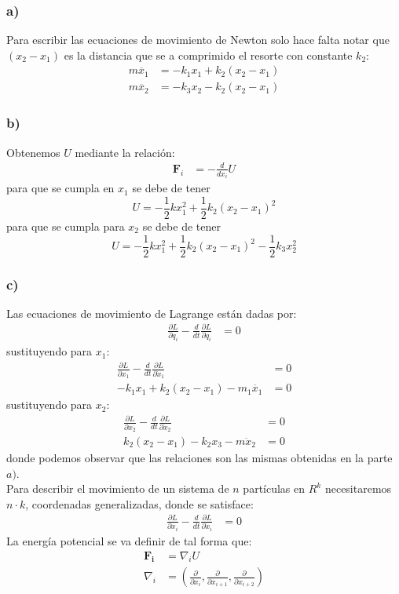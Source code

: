 \documentclass{article}
\begin{document}
\begin{tcolorbox}[breakable]
    \subsubsection*{a)}
    Para escribir las ecuaciones de movimiento de Newton solo hace falta notar que 
    $(x_2-x_1)$ es la distancia que se a comprimido el resorte con constante $k_2$:
    \begin{align*}
        m\ddot{x_1} &= -k_1x_1 + k_2(x_2-x_1) \\
        m\ddot{x_2} &= -k_3x_2 - k_2(x_2-x_1)
    \end{align*}
    \subsubsection*{b)}
    Obtenemos $U$ mediante la relación:
    \begin{align*}
        \bm{F}_i &= -\frac{d}{dx_i}U
    \end{align*}
    para que se cumpla en $x_1$ se debe de tener 
    \[U = -\frac{1}{2}kx_1^2+\frac{1}{2}k_2(x_2-x_1)^2\]
    para  que se cumpla para $x_2$ se debe de tener 
    \[U = -\frac{1}{2}kx_1^2+\frac{1}{2}k_2(x_2-x_1)^2-\frac{1}{2}k_3x_2^2 \]
    \subsubsection*{c)}
    Las ecuaciones de movimiento de Lagrange están dadas por:
    \begin{align*}
        \frac{\partial L}{\partial q_i} - \frac{d}{dt}\frac{\partial L }{\partial \dot{q}_i} &= 0 
    \end{align*}
    sustituyendo para $x_1$:
    \begin{align*}
        \frac{\partial L}{\partial x_1} - \frac{d}{dt}\frac{\partial L }{\partial \dot{x}_1} &= 0 \\
        -k_1x_1+k_2(x_2-x_1) - m_1\ddot{x_1} &= 0  
    \end{align*}
    sustituyendo para $x_2$:
    \begin{align*}
        \frac{\partial L}{\partial x_2} - \frac{d}{dt}\frac{\partial L }{\partial \dot{x}_2} &= 0 \\
        k_2(x_2-x_1)-k_2x_3 - m\ddot{x}_2 &= 0 
    \end{align*}
    donde podemos observar que las relaciones son las mismas obtenidas en la parte $a)$. \\
    Para describir el movimiento de un sistema de $n$ partículas en $R^k$ necesitaremos $n \cdot k$, 
    coordenadas generalizadas, donde se satisface:
    \begin{align*}
        \frac{\partial L}{\partial x_i} - \frac{d}{dt}\frac{\partial L }{\partial \dot{x}_i} &= 0 
    \end{align*}
    La energía potencial se va definir de tal forma que:
    \begin{align*}
        \bm{F_i} &= \nabla_i U \\
        \nabla_i &= \left( \frac{\partial }{\partial x_i}, \frac{\partial }{\partial x_{i+1}}, \frac{\partial }{\partial x_{i+2}} \right)
    \end{align*}
    
\end{tcolorbox}
\end{document}
